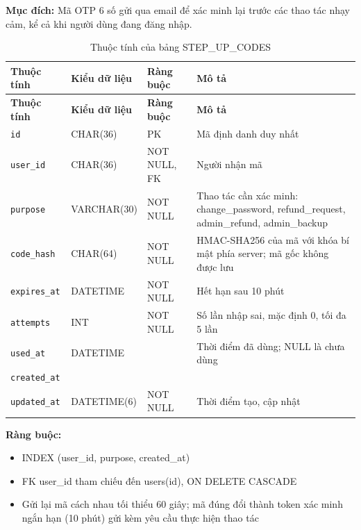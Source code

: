 \textbf{Mục đích:} Mã OTP 6 số gửi qua email để xác minh lại trước các thao tác nhạy cảm, kể cả khi người dùng đang đăng nhập.

{\small
\begin{longtable}{|P{3.2cm}|P{2.8cm}|P{2.2cm}|p{5.4cm}|}
    \caption{Thuộc tính của bảng STEP\_\allowbreak{}UP\_\allowbreak{}CODES}
    \label{tab:step_up_codes} \\
    \hline
    \textbf{Thuộc tính} & \textbf{Kiểu dữ liệu} & \textbf{Ràng buộc} & \textbf{Mô tả} \\
    \hline
    \endfirsthead
    \hline
    \textbf{Thuộc tính} & \textbf{Kiểu dữ liệu} & \textbf{Ràng buộc} & \textbf{Mô tả} \\
    \hline
    \endhead

    \texttt{id} & CHAR(36) & PK & Mã định danh duy nhất \\
    \hline
    \texttt{user\_\allowbreak{}id} & CHAR(36) & NOT NULL, FK & Người nhận mã \\
    \hline
    \texttt{purpose} & VARCHAR(30) & NOT NULL & Thao tác cần xác minh: change\_\allowbreak{}password, refund\_\allowbreak{}request, admin\_\allowbreak{}refund, admin\_\allowbreak{}backup \\
    \hline
    \texttt{code\_\allowbreak{}hash} & CHAR(64) & NOT NULL & HMAC-SHA256 của mã với khóa bí mật phía server; mã gốc không được lưu \\
    \hline
    \texttt{expires\_\allowbreak{}at} & DATETIME & NOT NULL & Hết hạn sau 10 phút \\
    \hline
    \texttt{attempts} & INT & NOT NULL & Số lần nhập sai, mặc định 0, tối đa 5 lần \\
    \hline
    \texttt{used\_\allowbreak{}at} & DATETIME &  & Thời điểm đã dùng; NULL là chưa dùng \\
    \hline
    \texttt{created\_\allowbreak{}at} &  &  &  \\
    \hline
    \texttt{updated\_\allowbreak{}at} & DATETIME(6) & NOT NULL & Thời điểm tạo, cập nhật \\
    \hline
\end{longtable}
}

\textbf{Ràng buộc:}
\begin{itemize}
    \item INDEX (user\_\allowbreak{}id, purpose, created\_\allowbreak{}at)
    \item FK user\_\allowbreak{}id tham chiếu đến users(id), ON DELETE CASCADE
    \item Gửi lại mã cách nhau tối thiểu 60 giây; mã đúng đổi thành token xác minh ngắn hạn (10 phút) gửi kèm yêu cầu thực hiện thao tác
\end{itemize}
